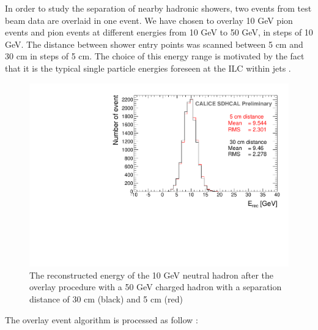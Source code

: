 \documentclass[cits]{JINST}
\begin{document}
In order to study the separation of nearby hadronic showers, two events from test beam data are overlaid in one event. We have chosen to overlay 10 GeV pion events and pion events at different energies from 10 GeV to 50 GeV, in steps of 10 GeV. The distance between shower entry points was scanned between 5 cm and 30 cm in steps of 5 cm. The choice of this energy range is motivated by the fact that it is the typical single particle energies foreseen at the ILC within jets \cite{hadron-jets}.

\begin{figure}[!h]
  \begin{center}
    \includegraphics[width=0.6\linewidth]{plots/OverlayEvent_OverlayCompare.pdf}
  \end{center}
  \caption{\label{OVERLAY_EVENT_MC_EREC_OVERLAID_HITS} The reconstructed energy of the 10 GeV neutral hadron after the overlay procedure with a 50 GeV charged hadron with a separation distance of 30 cm (black) and 5 cm (red)}
\end{figure}

The overlay event algorithm is processed as follow :
\end{document}
